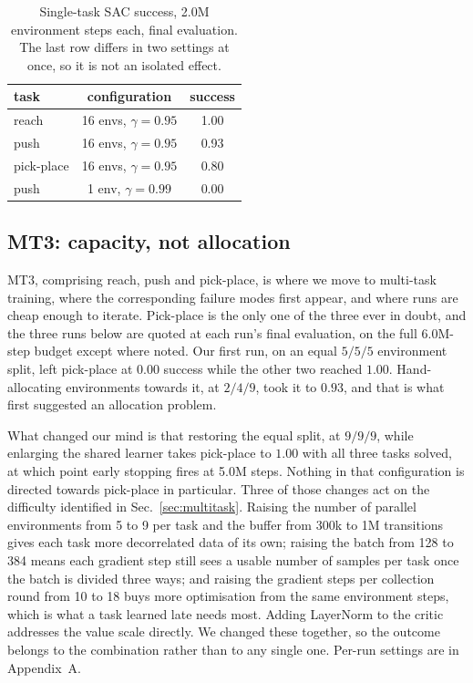 \documentclass[letterpaper, 10 pt, conference]{ieeeconf}
\begin{document}
\begin{table}[tb]
\caption{Single-task SAC success, 2.0M environment steps each, final evaluation. The last
row differs in two settings at once, so it is not an isolated effect.}
\label{tab:single}
\vspace{-0.2cm}
\begin{center}
\small
\begin{tabular}{lcc}
\toprule
task & configuration & success \\
\midrule
reach            & 16 envs, $\gamma = 0.95$ & 1.00 \\
push             & 16 envs, $\gamma = 0.95$ & 0.93 \\
pick-place       & 16 envs, $\gamma = 0.95$ & 0.80 \\
push             & 1 env, $\gamma = 0.99$   & 0.00 \\
\bottomrule
\end{tabular}
\vspace{-0.7cm}
\end{center}
\end{table}

\subsection{MT3: capacity, not allocation}
\label{sec:mt3}

MT3, comprising reach, push and pick-place, is where we move to multi-task training,
where the corresponding failure modes first appear, and where runs are cheap enough to
iterate. Pick-place is the only one of the three ever in doubt, and the three runs below are
quoted at each run's final evaluation, on the full 6.0M-step budget except where noted.
Our first run, on an equal $5/5/5$ environment split, left pick-place at $0.00$ success
while the other two reached $1.00$. Hand-allocating environments towards it, at $2/4/9$,
took it to $0.93$, and that is what first suggested an allocation problem.

What changed our mind is that restoring the equal split, at $9/9/9$, while enlarging
the shared learner takes pick-place to $1.00$ with all three tasks solved, at which point
early stopping fires at 5.0M steps. Nothing in that configuration is directed towards
pick-place in particular. Three of those changes act on the difficulty identified in
Sec.~\ref{sec:multitask}. Raising the number of parallel environments from 5 to 9 per task and
the buffer from 300k to 1M transitions gives each task more decorrelated data of its own;
raising the batch from 128 to 384 means each gradient step still sees a usable number of
samples per task once the batch is divided three ways; and raising the gradient steps per
collection round from 10 to 18 buys more optimisation from the same environment steps, which
is what a task learned late needs most. Adding LayerNorm to the critic addresses the value
scale directly. We changed these together, so the outcome belongs to the combination
rather than to any single one. Per-run settings are in Appendix~A.
\end{document}
